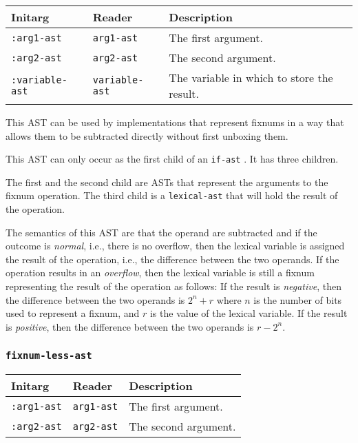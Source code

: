 \begin{tabular}{|l|l|l|}
\hline
Initarg & Reader & Description\\
\hline\hline
\texttt{:arg1-ast} & \texttt{arg1-ast} & The first argument.\\
\hline
\texttt{:arg2-ast} & \texttt{arg2-ast} & The second argument.\\
\hline
\texttt{:variable-ast} & \texttt{variable-ast} & The variable in which to store the result.\\
\hline
\end{tabular}

This AST can be used by implementations that represent fixnums in a
way that allows them to be subtracted directly without first unboxing
them.

This AST can only occur as the first child of an \texttt{if-ast}
.  It has three children.

The first and the second child are ASTs that represent the arguments
to the fixnum operation.  The third child is a
\texttt{lexical-ast} that will hold the result of the operation.

The semantics of this AST are that the operand are subtracted and if
the outcome is \emph{normal}, i.e., there is no overflow, then the
lexical variable is assigned the result of the operation, i.e., the
difference between the two operands.  If the operation results in an
\emph{overflow}, then the lexical variable is still a fixnum
representing the result of the operation as follows: If the result is
\emph{negative}, then the difference between the two operands is $2^n
+ r$ where $n$ is the number of bits used to represent a fixnum, and
$r$ is the value of the lexical variable.  If the result is
\emph{positive}, then the difference between the two operands is $r -
2^n$.

\subsubsection{\texttt{fixnum-less-ast}}
\label{fixnum-less-ast}

\begin{tabular}{|l|l|l|}
\hline
Initarg & Reader & Description\\
\hline\hline
\texttt{:arg1-ast} & \texttt{arg1-ast} & The first argument.\\
\hline
\texttt{:arg2-ast} & \texttt{arg2-ast} & The second argument.\\
\hline
\end{tabular}

